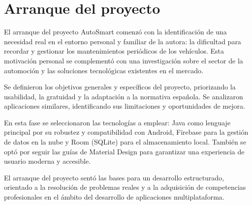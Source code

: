 \chapter{Arranque del proyecto}

El arranque del proyecto AutoSmart comenzó con la identificación de una necesidad real en el entorno personal y familiar de la autora: la dificultad para recordar y gestionar los mantenimientos periódicos de los vehículos. Esta motivación personal se complementó con una investigación sobre el sector de la automoción y las soluciones tecnológicas existentes en el mercado.

Se definieron los objetivos generales y específicos del proyecto, priorizando la usabilidad, la gratuidad y la adaptación a la normativa española. Se analizaron aplicaciones similares, identificando sus limitaciones y oportunidades de mejora.

En esta fase se seleccionaron las tecnologías a emplear: Java como lenguaje principal por su robustez y compatibilidad con Android, Firebase para la gestión de datos en la nube y Room (SQLite) para el almacenamiento local. También se optó por seguir las guías de Material Design para garantizar una experiencia de usuario moderna y accesible.

El arranque del proyecto sentó las bases para un desarrollo estructurado, orientado a la resolución de problemas reales y a la adquisición de competencias profesionales en el ámbito del desarrollo de aplicaciones multiplataforma. 